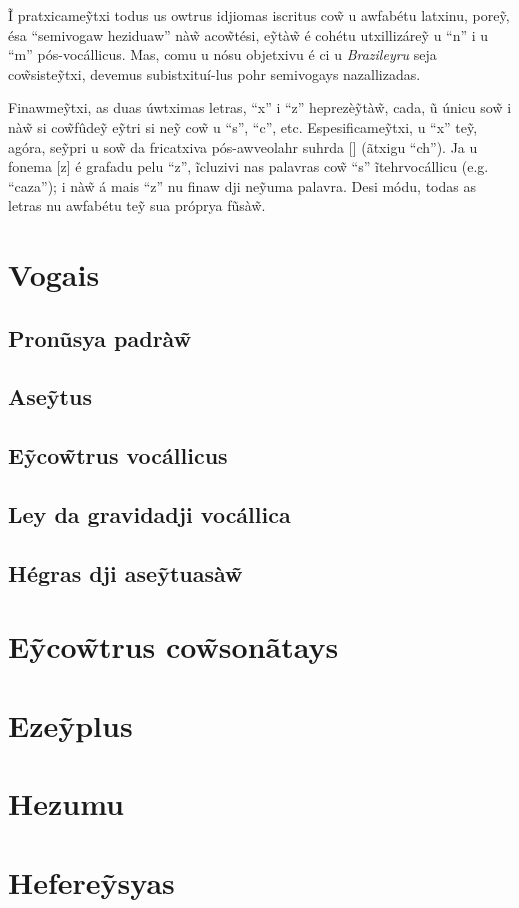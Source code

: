 \documentclass[12pt, a5paper, titlepage]{article}
\begin{document}
\begin{bilingualpages}

    Ĩ pratxicame\~ytxi todus us owtrus idjiomas iscritus co\~w u awfabétu latxinu, pore\~y, ésa ``semivogaw heziduaw'' nà\~w aco\~wtési, e\~ytà\~w é cohétu utxillizáre\~y u ``n'' i u ``m'' pós-vocállicus. Mas, comu u nósu objetxivu é ci u \textit{Brazileyru} seja co\~wsiste\~ytxi, devemus subistxituí-lus pohr semivogays nazallizadas.

    Finawme\~ytxi, as duas úwtximas letras, ``x'' i ``z'' heprezè\~ytà\~w, cada, ũ únicu so\~w i nà\~w si co\~wfûde\~y e\~ytri si ne\~y co\~w u ``s'', ``c'', etc. Espesificame\~ytxi, u ``x'' te\~y, agóra, se\~ypri u so\~w da fricatxiva pós-awveolahr suhrda [\textesh] (ãtxigu ``ch''). Ja u fonema [z] é grafadu pelu ``z'', ĩcluzivi nas palavras co\~w ``s'' ĩtehrvocállicu (e.g. ``caza''); i nà\~w á mais ``z'' nu finaw dji ne\~yuma palavra. Desi módu, todas as letras nu awfabétu te\~y sua próprya fũsà\~w.

    \section{Vogais}
    \subsection{Pronũsya padrà\~w}
    \subsection{Ase\~ytus}
    \subsection{E\~yco\~wtrus vocállicus}
    \subsection{Ley da gravidadji vocállica}
    \subsection{Hégras dji ase\~ytuasà\~w}

    \section{E\~yco\~wtrus co\~wsonãtays}

    \section{Eze\~yplus}
    
\end{bilingualpages}

\newpage
\section{Hezumu}

\newpage
\section{Hefere\~ysyas}
\end{document}
